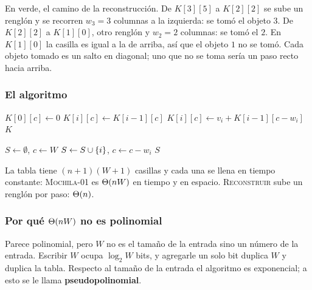 \documentclass[11pt,letterpaper]{article}
\begin{document}
En verde, el camino de la reconstrucción. De $K[3][5]$ a $K[2][2]$ se
sube un renglón y se recorren $w_3 = 3$ columnas a la izquierda: se
tomó el objeto $3$. De $K[2][2]$ a $K[1][0]$, otro renglón y $w_2 = 2$
columnas: se tomó el $2$. En $K[1][0]$ la casilla es igual a la de
arriba, así que el objeto $1$ no se tomó. Cada objeto tomado es un
salto en diagonal; uno que no se toma sería un paso recto hacia
arriba.

\subsubsection*{El algoritmo}

\begin{algorithm}[H]
\caption{\textsc{Mochila-01}$(w, v, n, W)$}
\begin{algorithmic}[1]
  \State $K[0][c] \gets 0$
\EndFor
{}
    \State $K[i][c] \gets K[i-1][c]$ 
      \State $K[i][c] \gets v_i + K[i-1][c - w_i]$ 
    \EndIf
  \EndFor
\EndFor
\State \Return $K$
\end{algorithmic}
\end{algorithm}

\begin{algorithm}[H]
\caption{\textsc{Reconstruir}$(K, w, n, W)$}
\begin{algorithmic}[1]
\State $S \gets \emptyset$, \quad $c \gets W$
    \State $S \gets S \cup \left\{ i \right\}$, \quad $c \gets c - w_i$
  \EndIf
\EndFor
\State \Return $S$
\end{algorithmic}
\end{algorithm}

La tabla tiene $(n + 1)(W + 1)$ casillas y cada una se llena en tiempo
constante: \textsc{Mochila-01} es $\Theta\!\left(n W\right)$ en tiempo y en espacio.
\textsc{Reconstruir} sube un renglón por paso: $\Theta\!\left(n\right)$.

\subsubsection*{Por qué $\Theta\!\left(nW\right)$ no es polinomial}

Parece polinomial, pero $W$ no es el tamaño de la entrada sino un
número de la entrada. Escribir $W$ ocupa $\log_2 W$ bits, y agregarle
un solo bit duplica $W$ y duplica la tabla. Respecto al tamaño de la
entrada el algoritmo es exponencial; a esto se le llama
\textbf{pseudopolinomial}.
\end{document}
